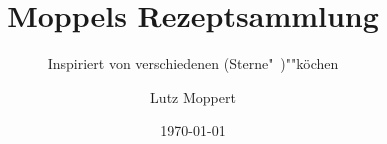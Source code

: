 \documentclass[fontsize=11pt, paper=a4, toc=index, DIV=12, BCOR=10mm]{scrbook}
\begin{document}
%
%
\frontmatter

\subject{\textcolor{SubjectColor}{Gute Küche ganz einfach}}
\title{\textcolor{TitleColor}{Moppels Rezeptsammlung}}
\subtitle{\textcolor{SubtitleColor}{Inspiriert von verschiedenen (Sterne"~)""köchen}}
\author{\textcolor{AuthorColor}{Lutz Moppert}}
\date{\textcolor{DateColor}{\today}}  %
\dedication{Gewidmet meiner geliebten Frau Uta und unseren fröhlichen Kindern
  Line und Tim, die alle Rezepte probiert und manchmal gelitten, es jedoch
  meist genossen haben.}
\maketitle
\newpage

\tableofcontents
%
%
\mainmatter
{}
\end{document}
